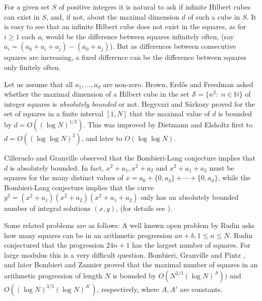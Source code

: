 \documentclass[10pt]{amsart}
\theoremstyle{plain}
\def\cal{\mathcal}
\begin{document}
For a given set $S$ of positive integers it is natural to ask if infinite Hilbert cubes can exist in $S$,
and, if not, about the maximal dimension $d$ of such a cube in $S$. It is easy to see that an infinite Hilbert cube does not exist in the squares, as for $i \geq 1$ each $a_i$ would be the difference between squares infinitely often, 
(say $a_i=(a_0+a_i+a_j)-(a_0+a_j)$). But as
differences between consecutive squares are increasing, a fixed difference can be the difference between squares only finitely often.

Let us assume that all $a_1, \ldots , a_d$ are non-zero.
Brown, Erd\H{o}s and Freedman \cite{BrownandErdosandFreedman:1990}
asked whether the maximal dimension of a Hilbert cube in the set $\cal{S}=\{n^2:\;n\in\mathbb{N}\}$ of integer squares is \emph{absolutely bounded} or not. 
Hegyvari and S\'{a}rkozy \cite{HegyvariandSarkozy:1999}
 proved for the set of squares in a finite interval $[1,N]$
that the maximal value of $d$ is bounded by $d=O((\log N)^{1/3})$.
This was improved by Dietmann and Elsholtz \cite{Dietmann-Elsholtz:2012, Dietmann-Elsholtz:2015} first to $d=O((\log \log N)^2)$, and later to $O(\log \log N)$.

Cilleruelo and Granville
\cite{CillerueloandGranville:2007} observed that
the Bombieri-Lang conjecture implies that $d$ is absolutely bounded.
In fact, $x^2+a_1, x^2+a_2$ and $x^2+a_1+a_2$ must be squares for the many distinct values of $x=a_0 + \{0,a_3\} + \cdots + \{0,a_d\}$, while the Bombieri-Lang conjecture implies that the curve
$y^2=(x^2+a_1)(x^2+a_2)(x^2+a_1+a_2)$ only has an absolutely bounded number of integral solutions $(x,y)$,
(for details see \cite{CaporasoHarrisandMazur, ShkredovandSolymosi}).

Some related problems are as follows:
A well known open problem by Rudin asks how many squares 
can be in an arithmetic progression $an+b, 1\leq n \leq N$. Rudin conjectured that the progression $24n+1$ has the largest number of squares. For large modulus this is a very difficult question.
Bombieri, Granville and Pintz \cite{BombieriGranvilleandPintz},  and later Bombieri and Zannier \cite{BombieriandZannier} proved that the  maximal number of squares in an arithmetic progression of length $N$ is bounded by $O(N^{2/3}(\log N)^A))$ and $O((\log N)^{3/5}(\log N)^{A'})$, respectively, where $A,A'$ are constants.
\end{document}
